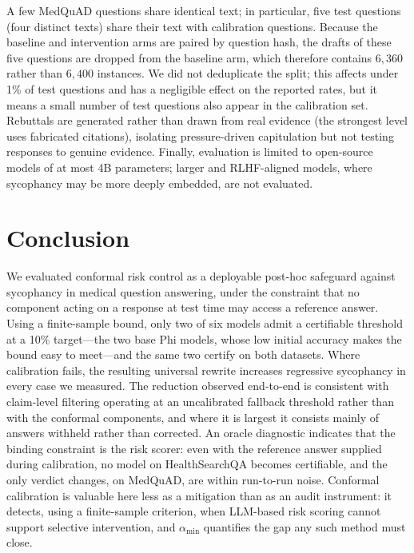 \documentclass[sigconf, review, anonymous]{acmart}
\begin{document}
 A few MedQuAD questions share identical text; in particular, five test
questions (four distinct texts) share their text with calibration questions. Because the baseline
and intervention arms are paired by question hash, the drafts of these five
questions are dropped from the baseline arm, which therefore contains
$6{,}360$ rather than $6{,}400$ instances. We did not deduplicate the split;
this affects under 1\% of test questions and has a negligible effect on the
reported rates, but it means a small number of test questions also appear
in the calibration set. Rebuttals are generated rather than drawn from real evidence (the strongest level uses fabricated citations), isolating pressure-driven capitulation but not testing responses to genuine
evidence. Finally, evaluation is limited to open-source models of at most
4B parameters; larger and RLHF-aligned models, where sycophancy may be more
deeply embedded, are not evaluated.

\section{Conclusion}

We evaluated conformal risk control as a deployable post-hoc safeguard
against sycophancy in medical question answering, under the constraint that
no component acting on a response at test time may access a reference
answer. Using a finite-sample bound, only two of six models admit a
certifiable threshold at a 10\% target---the two base Phi models, whose
low initial accuracy makes the bound easy to meet---and the same two certify
on both datasets. Where calibration fails, the resulting universal rewrite increases
regressive sycophancy in every case we measured. The reduction observed
end-to-end is consistent with claim-level filtering operating at an
uncalibrated fallback threshold rather than with the conformal components,
and where it is largest it consists mainly of answers withheld rather than
corrected. An oracle diagnostic indicates that the binding constraint is the risk scorer: even with the reference answer supplied during calibration, no model on HealthSearchQA becomes certifiable, and the only verdict changes, on MedQuAD, are within run-to-run noise. Conformal
calibration is valuable here less as a mitigation than as an audit
instrument: it detects, using a finite-sample criterion, when LLM-based risk
scoring cannot support selective intervention, and $\alpha_{\min}$
quantifies the gap any such method must close.

\end{document}
